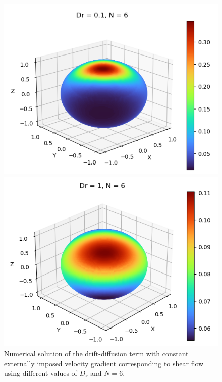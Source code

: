 \begin{frame}
	\scriptsize
	\begin{figure}[H]
		\centering
		\begin{minipage}{0.4\textwidth}
			\includegraphics[scale=0.4]{Bilder_wxwy/Sol_onSphere_wxwy_Dr=0.1_N=6}
		\end{minipage}
		\hfill 
		\begin{minipage}{0.4\textwidth}
			\includegraphics[scale=0.4]{Bilder_wxwy/Sol_onSphere_wxwy_Dr=1_N=6}
		\end{minipage}
		\caption{ Numerical solution of the drift-diffusion term with constant externally imposed velocity gradient corresponding to shear flow using different values of $D_r$ and $N = 6$.}
	\end{figure}
\end{frame}


